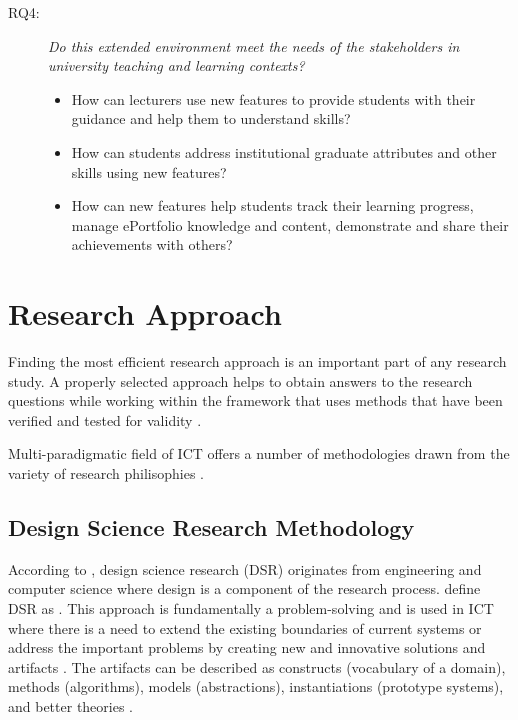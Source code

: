 \begin{description}
	\item[RQ4:] \textit{Do this extended environment meet the needs of the
	stakeholders in university teaching and learning contexts?}
	\begin{itemize}
		\item How can lecturers use new features to provide students with their
guidance and help them to understand \LLLs skills?
		\item How can students address institutional graduate attributes and other
		skills using new features?
		\item How can new features help students track their learning progress, manage
ePortfolio knowledge and content, demonstrate and share their achievements
with others?
	\end{itemize}
\end{description}

\section{Research Approach}
\label{sec:method}

Finding the most efficient research approach is an important part of any
research study. A properly selected approach helps to obtain answers to the
research questions while working within the framework that uses methods that
have been verified and tested for validity \citep{Kumar2005}.

Multi-paradigmatic field of ICT offers a number of methodologies drawn from the
variety of research philisophies \citep{Vaishnavi2007}.


\subsection{Design Science Research Methodology}

According to \citet{Peffers2008}, design science research (DSR) originates from
engineering and computer science where design is a component of the research
process. \citet{Iivari2009} define DSR as . This approach is fundamentally a problem-solving and is used in
ICT where there is a need to extend the existing boundaries of current systems
or address the important problems by creating new and innovative solutions and
artifacts \citep{Hevner2004}. The artifacts can be described as constructs
(vocabulary of a domain), methods (algorithms), models (abstractions),
instantiations (prototype systems), and better theories
\citep{Hevner2010,Vaishnavi2007}.


